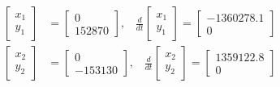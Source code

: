 \begin{equation}
\begin{align*}
\left[ \begin{matrix} x_{ 1 } \\ y_{ 1 } \end{matrix} \right] &=\left[ \begin{matrix} 0 \\ 152870 \end{matrix} \right] ,\;\;\; 
\frac { d }{ dt } \left[ \begin{matrix} x_{ 1 } \\ y_{ 1 } \end{matrix} \right] =\left[ \begin{matrix} -1360278.1 \\ 0 \end{matrix} \right]  \\
\left[ \begin{matrix} x_{ 2 } \\ y_{ 2 } \end{matrix} \right] &=\left[ \begin{matrix} 0 \\ -153130 \end{matrix} \right] ,\; \;\;
\frac { d }{ dt } \left[ \begin{matrix} x_{ 2 } \\ y_{ 2 } \end{matrix} \right] =\left[ \begin{matrix} 1359122.8 \\ 0 \end{matrix} \right] 
\end{align*}
\label{eq:2}
\end{equation}

\noindent\makebox[\linewidth]{\rule{\textwidth}{0.4pt}}

